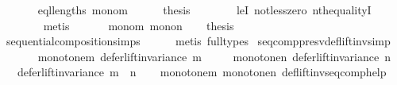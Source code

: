 \begin{isabellebody}
\ \ \ \ \isamarkupfalse%
\ {}\ eql{\isacharunderscore}{\kern0pt}lengths\ mono{\isacharunderscore}{\kern0pt}m\isanewline
\ \ \ \ \isamarkupfalse%
\ {\isacharquery}{\kern0pt}thesis\isanewline
\ \ \ \ \ \ \isamarkupfalse%
\ leI\ not{\isacharunderscore}{\kern0pt}less{\isacharunderscore}{\kern0pt}zero\ nth{\isacharunderscore}{\kern0pt}equalityI\isanewline
\ \ \ \ \ \ \isamarkupfalse%
\ metis\isanewline
\ \ \isamarkupfalse%
\isanewline
\ \ \isamarkupfalse%
\ mono{\isacharunderscore}{\kern0pt}m\ mono{\isacharunderscore}{\kern0pt}n\isanewline
\ \ \isamarkupfalse%
\ {\isacharquery}{\kern0pt}thesis\isanewline
\ \ \ \ \isamarkupfalse%
\ sequential{\isacharunderscore}{\kern0pt}composition{\isachardot}{\kern0pt}simps\isanewline
\ \ \ \ \isamarkupfalse%
\ {\isacharparenleft}{\kern0pt}metis\ {\isacharparenleft}{\kern0pt}full{\isacharunderscore}{\kern0pt}types{\isacharparenright}{\kern0pt}{\isacharparenright}{\kern0pt}\isanewline
{}\isamarkupfalse%
%
\endisatagproof
{\isafoldproof}%
%
\isadelimproof
\isanewline
%
\endisadelimproof
\isanewline
\isanewline
{}\isamarkupfalse%
\ seq{\isacharunderscore}{\kern0pt}comp{\isacharunderscore}{\kern0pt}presv{\isacharunderscore}{\kern0pt}def{\isacharunderscore}{\kern0pt}lift{\isacharunderscore}{\kern0pt}inv{\isacharbrackleft}{\kern0pt}simp{\isacharbrackright}{\kern0pt}{\isacharcolon}{\kern0pt}\isanewline
\ \ \isanewline
\ \ \ \ monotone{\isacharunderscore}{\kern0pt}m{\isacharcolon}{\kern0pt}\ {\isachardoublequoteopen}defer{\isacharunderscore}{\kern0pt}lift{\isacharunderscore}{\kern0pt}invariance\ m{\isachardoublequoteclose}\ \isanewline
\ \ \ \ monotone{\isacharunderscore}{\kern0pt}n{\isacharcolon}{\kern0pt}\ {\isachardoublequoteopen}defer{\isacharunderscore}{\kern0pt}lift{\isacharunderscore}{\kern0pt}invariance\ n{\isachardoublequoteclose}\isanewline
\ \ \ {\isachardoublequoteopen}defer{\isacharunderscore}{\kern0pt}lift{\isacharunderscore}{\kern0pt}invariance\ {\isacharparenleft}{\kern0pt}m\ {\isasymtriangleright}\ n{\isacharparenright}{\kern0pt}{\isachardoublequoteclose}\isanewline
%
\isadelimproof
\ \ %
\endisadelimproof
%
\isatagproof
{}\isamarkupfalse%
\ monotone{\isacharunderscore}{\kern0pt}m\ monotone{\isacharunderscore}{\kern0pt}n\ def{\isacharunderscore}{\kern0pt}lift{\isacharunderscore}{\kern0pt}inv{\isacharunderscore}{\kern0pt}seq{\isacharunderscore}{\kern0pt}comp{\isacharunderscore}{\kern0pt}help\isanewline

\end{isabellebody}

